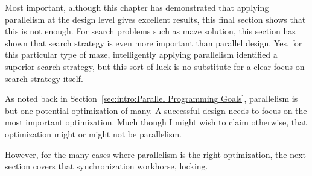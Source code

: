 Most important, although this chapter has demonstrated that applying
parallelism at the design level gives excellent results, this final
section shows that this is not enough.
For search problems such as maze solution, this section has shown that
search strategy is even more important than parallel design.
Yes, for this particular type of maze, intelligently applying parallelism
identified a superior search strategy, but this sort of luck is no
substitute for a clear focus on search strategy itself.

As noted back in Section~\ref{sec:intro:Parallel Programming Goals},
parallelism is but one potential optimization of many.
A successful design needs to focus on the most important optimization.
Much though I might wish to claim otherwise, that optimization might
or might not be parallelism.

However, for the many cases where parallelism is the right optimization,
the next section covers that synchronization workhorse, locking.
